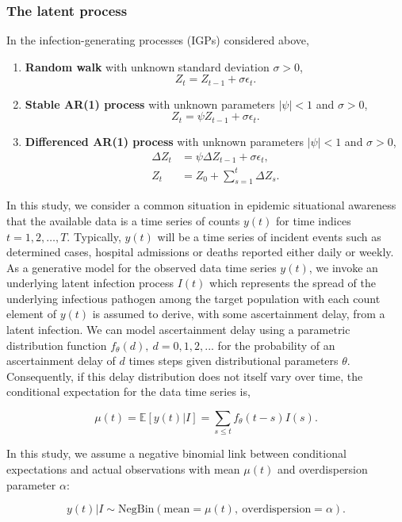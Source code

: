 \documentclass{getwriting}
\begin{document}
\subsubsection{The latent process}
In the infection-generating processes (IGPs) considered above, 
\begin{enumerate}
    \item \textbf{Random walk} with unknown standard deviation $\sigma >0 $, 
        \begin{equation}
            Z_t = Z_{t-1} + \sigma \epsilon_t.
        \end{equation}
    \item \textbf{Stable AR(1) process} with unknown parameters $|\psi| < 1 $ and $\sigma > 0$,
    \begin{equation}
        Z_t = \psi Z_{t-1} + \sigma \epsilon_t.
    \end{equation}
    \item \textbf{Differenced AR(1) process} with unknown parameters $|\psi| < 1 $ and $\sigma > 0$,
    \begin{equation}
        \begin{split}
            \Delta Z_t &= \psi \Delta Z_{t-1} + \sigma \epsilon_t,\\
            Z_t &= Z_0 + \sum_{s=1}^t\Delta Z_{s} .
        \end{split}
    \end{equation}
\end{enumerate}


In this study, we consider a common situation in epidemic situational awareness that the available data is a time series of counts $y(t)$ for time indices $t = 1, 2, \dots, T$. Typically, $y(t)$ will be a time series of incident events such as determined cases, hospital admissions or deaths reported either daily or weekly. As a generative model for the observed data time series $y(t)$, we invoke an underlying latent infection process $I(t)$ which represents the spread of the underlying infectious pathogen among the target population with each count element of $y(t)$ is assumed to derive, with some ascertainment delay, from a latent infection. We can model ascertainment delay using a parametric distribution function $f_\theta(d),~ d = 0, 1, 2,...$ for the probability of an ascertainment delay of $d$ times steps given distributional parameters $\theta$. Consequently, if this delay distribution does not itself vary over time, the conditional expectation for the data time series is,

\begin{equation}
\mu(t) = \mathbb{E}[y(t) | I] = \sum_{s \leq t} f_\theta(t-s) I(s).
\end{equation}

In this study, we assume a negative binomial link between conditional expectations and actual observations with mean $\mu(t)$ and overdispersion parameter $\alpha$:

\begin{equation}
    y(t) | I \sim \text{NegBin}(\text{mean} = \mu(t), ~ \text{overdispersion} = \alpha).
\end{equation}
\end{document}
